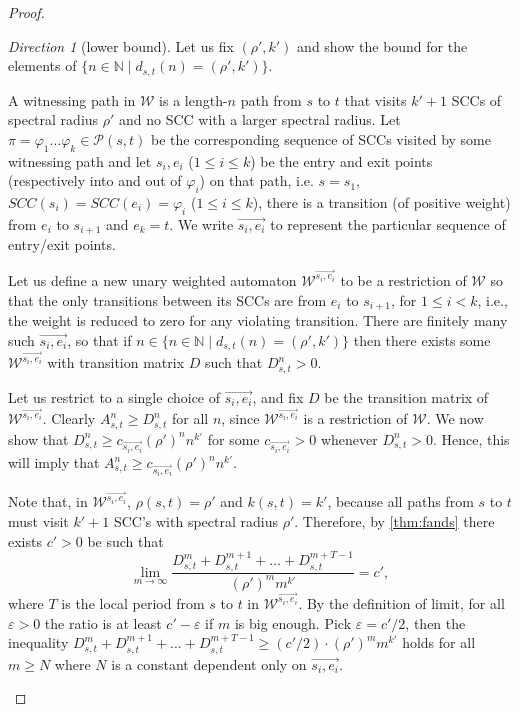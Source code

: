 \documentclass[10pt,a4paper]{amsart}
\numberwithin{equation}{section}
\theoremstyle{plain}
\theoremstyle{definition}
\theoremstyle{remark}
\newtheorem{dir}{Direction}
\newcommand\period{T}
\newcommand{\SCC}{\ensuremath{\mathit{SCC}}}
\newcommand{\scc}{\varphi}
\newcommand\wa{\mathcal{W}}
\begin{document}
\begin{proof}
\hfill

\begin{dir}[{lower bound}]
Let us fix $(\rho',k')$ and show the bound for the elements of $\{n\in\mathbb{N} \mid d_{s,t}(n)= (\rho',k')\}$.

A witnessing path in $\wa$ is a length-$n$ path from $s$ to $t$ that visits $k'+1$ SCCs of spectral radius $\rho'$ and no SCC with a  larger spectral radius.
Let $\pi = \scc_1\dots\scc_k \in \mathscr{P}(s,t)$  be the corresponding sequence of SCCs visited by some witnessing path and let $s_i, e_i$ ($1\le i\le k$) be the entry and exit points (respectively into and out of $\scc_i$) on that path,
i.e.  $s=s_1$, $\SCC(s_i) = \SCC(e_i) = \scc_i$ ($1 \le i \le k$), there is a transition (of positive weight) from $e_i$ to $s_{i+1}$ and $e_k=t$. We write $\vec{s_i,e_i}$ to represent the particular sequence of entry/exit points.

Let us define  a new unary weighted automaton  $\wa^{\vec{s_i,e_i}}$ to be a restriction of $\wa$ so that
the only transitions between its SCCs are from $e_i$ to $s_{i+1}$, for $1 \le i < k$,
i.e., the weight is reduced to zero for any violating transition.  There are finitely many such $\vec{s_i,e_i}$, so that if $n \in \{n\in\mathbb{N} \mid d_{s,t}(n)= (\rho',k')\}$ then there exists some $\wa^{\vec{s_i,e_i}}$ with transition matrix $D$ such that $D_{s,t}^n > 0$.

Let us restrict to a single choice of $\vec{s_i,e_i}$, and fix $D$ be the transition matrix of $\wa^{\vec{s_i,e_i}}$. Clearly $A_{s,t}^n \ge D_{s,t}^n$ for all $n$, since $\wa^{\vec{s_i,e_i}}$ is a restriction of $\wa$. We now show that $D_{s,t}^n \ge c_{\vec{s_i,e_i}}(\rho')^n n^{k'}$ for some $c_{\vec{s_i,e_i}} > 0$ whenever $D_{s,t}^{n}>0$. Hence, this will imply that $A_{s,t}^n\ge c_{\vec{s_i,e_i}}(\rho')^n n^{k'}$.

Note that, in $\wa^{\vec{s_i,e_i}}$, $\rho(s,t)=\rho'$ and $k(s,t)=k'$,
because  all paths from $s$ to $t$ must visit $k'+1$ SCC's with spectral radius $\rho'$. Therefore, by \cref{thm:fands} there exists $c'>0$ be such that
\[\lim_{m\to\infty} \frac{D_{s,t}^m + D_{s,t}^{m+1} + \dots + D_{s,t}^{m+T-1}}{(\rho')^m m^{k'}} = c', \]
where $\period$ is the local period from $s$ to $t$ in $\wa^{\vec{s_i,e_i}}$. By the definition of limit,
for all $\varepsilon > 0$ the ratio is at least $c' - \varepsilon$
if $m$ is big enough.
Pick $\varepsilon = c'/2$, then the inequality
$D_{s,t}^m + D_{s,t}^{m+1} + \dots + D_{s,t}^{m+T-1} \ge (c'/2) \cdot (\rho')^m m^{k'}$
holds for all $m \ge N$ where $N$ is a constant dependent
only on $\vec{s_i,e_i}$.


\end{dir}
\end{proof}
\end{document}
